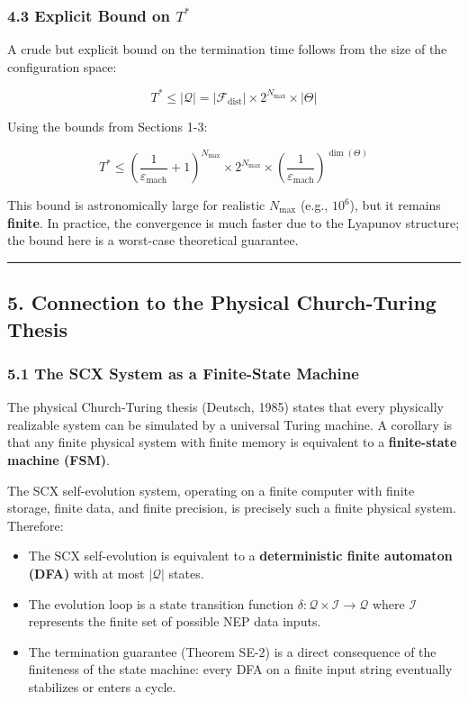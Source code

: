 \documentclass[
  12pt,
]{ctexart}
\providecommand{\tightlist}{%
  \setlength{\itemsep}{0pt}\setlength{\parskip}{0pt}}
\begin{document}
\subsubsection{\texorpdfstring{4.3 Explicit Bound on
\(T^*\)}{4.3 Explicit Bound on T\^{}*}}\label{explicit-bound-on-t}

A crude but explicit bound on the termination time follows from the size
of the configuration space:

\[T^* \leq |\mathcal{Q}| = |\mathcal{F}_{\text{dist}}| \times 2^{N_{\text{max}}} \times |\Theta|\]

Using the bounds from Sections 1-3:

\[T^* \leq \left( \frac{1}{\varepsilon_{\text{mach}}} + 1 \right)^{N_{\text{max}}} \times 2^{N_{\text{max}}} \times \left( \frac{1}{\varepsilon_{\text{mach}}} \right)^{\dim(\Theta)}\]

This bound is astronomically large for realistic \(N_{\text{max}}\)
(e.g., \(10^6\)), but it remains \textbf{finite}. In practice, the
convergence is much faster due to the Lyapunov structure; the bound here
is a worst-case theoretical guarantee.

\begin{center}\rule{0.5\linewidth}{0.5pt}\end{center}

\subsection{5. Connection to the Physical Church-Turing
Thesis}\label{connection-to-the-physical-church-turing-thesis}

\subsubsection{5.1 The SCX System as a Finite-State
Machine}\label{the-scx-system-as-a-finite-state-machine}

The physical Church-Turing thesis (Deutsch, 1985) states that every
physically realizable system can be simulated by a universal Turing
machine. A corollary is that any finite physical system with finite
memory is equivalent to a \textbf{finite-state machine (FSM)}.

The SCX self-evolution system, operating on a finite computer with
finite storage, finite data, and finite precision, is precisely such a
finite physical system. Therefore:

\begin{itemize}
\tightlist
\item
  The SCX self-evolution is equivalent to a \textbf{deterministic finite
  automaton (DFA)} with at most \(|\mathcal{Q}|\) states.
\item
  The evolution loop is a state transition function
  \(\delta: \mathcal{Q} \times \mathcal{I} \to \mathcal{Q}\) where
  \(\mathcal{I}\) represents the finite set of possible NEP data inputs.
\item
  The termination guarantee (Theorem SE-2) is a direct consequence of
  the finiteness of the state machine: every DFA on a finite input
  string eventually stabilizes or enters a cycle.
\end{itemize}
\end{document}
